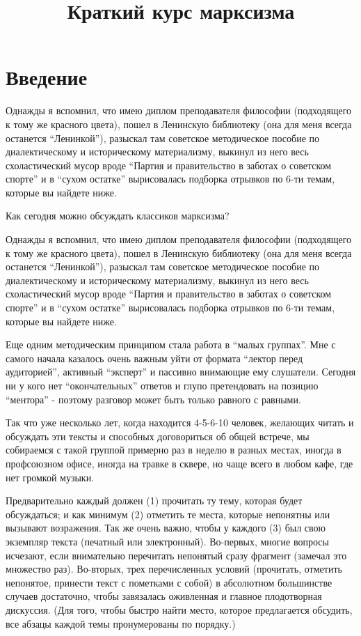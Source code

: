 \documentclass[12pt]{article}
\title{Краткий курс марксизма}
\begin{document}
\maketitle

\tableofcontents

\newpage

\section*{Введение}
\label{sec:intro}

Однажды я вспомнил, что имею диплом преподавателя философии (подходящего к тому же красного цвета), пошел в Ленинскую библиотеку (она для меня всегда останется “Ленинкой”), разыскал там советское методическое пособие по диалектическому и историческому материализму, выкинул из него весь схоластический мусор вроде “Партия и правительство в заботах о советском спорте” и в “сухом остатке” вырисовалась подборка отрывков по 6-ти темам, которые вы найдете ниже.

Как сегодня можно обсуждать классиков марксизма?

Однажды я вспомнил, что имею диплом преподавателя философии (подходящего к тому же красного цвета), пошел в Ленинскую библиотеку (она для меня всегда останется “Ленинкой”), разыскал там советское методическое пособие по диалектическому и историческому материализму, выкинул из него весь схоластический мусор вроде “Партия и правительство в заботах о советском спорте” и в “сухом остатке” вырисовалась подборка отрывков по 6-ти темам, которые вы найдете ниже.

Еще одним методическим принципом стала работа в “малых группах”. Мне с самого начала казалось очень важным уйти от формата “лектор перед аудиторией”, активный “эксперт” и пассивно внимающие ему слушатели. Сегодня ни у кого нет “окончательных” ответов и глупо претендовать на позицию “ментора” - поэтому разговор может быть только равного с равными.

Так что уже несколько лет, когда находится 4-5-6-10 человек, желающих читать и обсуждать эти тексты и способных договориться об общей встрече, мы собираемся с такой группой примерно раз в неделю в разных местах, иногда в профсоюзном офисе, иногда на травке в сквере, но чаще всего в любом кафе, где нет громкой музыки.

Предварительно каждый должен (1) прочитать ту тему, которая будет обсуждаться; и как минимум (2) отметить те места, которые непонятны или вызывают возражения. Так же очень важно, чтобы у каждого (3) был свою экземпляр текста (печатный или электронный). Во-первых, многие вопросы исчезают, если внимательно перечитать непонятый сразу фрагмент (замечал это множество раз). Во-вторых, трех перечисленных условий (прочитать, отметить непонятое, принести текст с пометками с собой) в абсолютном большинстве случаев достаточно, чтобы завязалась оживленная и главное плодотворная дискуссия. (Для того, чтобы быстро найти место, которое предлагается обсудить, все абзацы каждой темы пронумерованы по порядку.)
\end{document}
